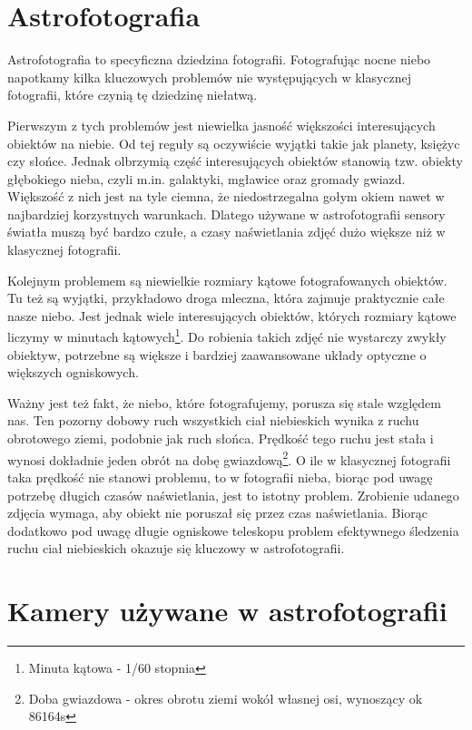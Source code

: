 \section{Astrofotografia}

Astrofotografia to specyficzna dziedzina fotografii. Fotografując nocne niebo
napotkamy kilka kluczowych problemów nie występujących w klasycznej fotografii,
które czynią tę dziedzinę niełatwą.

Pierwszym z tych problemów jest niewielka jasność większości interesujących
obiektów na niebie. Od tej reguły są oczywiście wyjątki takie jak planety,
księżyc czy słońce. Jednak olbrzymią część interesujących obiektów stanowią tzw.
obiekty głębokiego nieba, czyli m.in. galaktyki, mgławice oraz gromady gwiazd.
Większość z nich jest na tyle ciemna, że niedostrzegalna gołym okiem nawet
w najbardziej korzystnych warunkach. Dlatego używane w astrofotografii sensory
światła muszą być bardzo czułe, a czasy naświetlania zdjęć dużo większe niż
w klasycznej fotografii.

Kolejnym problemem są niewielkie rozmiary kątowe fotografowanych obiektów. Tu
też są wyjątki, przykładowo droga mleczna, która zajmuje praktycznie całe nasze
niebo. Jest jednak wiele interesujących obiektów, których rozmiary kątowe
liczymy w minutach kątowych\footnote{Minuta kątowa - 1/60 stopnia}. Do robienia
takich zdjęć nie wystarczy zwykły obiektyw, potrzebne są większe i bardziej
zaawansowane układy optyczne o większych ogniskowych.

Ważny jest też fakt, że niebo, które fotografujemy, porusza się stale względem
nas. Ten pozorny dobowy ruch wszystkich ciał niebieskich wynika z ruchu
obrotowego ziemi, podobnie jak ruch słońca. Prędkość tego ruchu jest stała
i wynosi dokładnie jeden obrót na dobę gwiazdową\footnote{Doba gwiazdowa - okres
obrotu ziemi wokół własnej osi, wynoszący ok 86164s}.  O ile w klasycznej
fotografii taka prędkość nie stanowi problemu, to w fotografii nieba, biorąc pod
uwagę potrzebę długich czasów naświetlania, jest to istotny problem. Zrobienie
udanego zdjęcia wymaga, aby obiekt nie poruszał się przez czas naświetlania.
Biorąc dodatkowo pod uwagę długie ogniskowe teleskopu problem efektywnego
śledzenia ruchu ciał niebieskich okazuje się kluczowy w astrofotografii.

\section{Kamery używane w astrofotografii}

